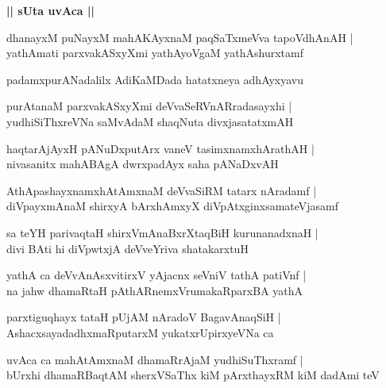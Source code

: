 \documentclass[twoside,12pt,openright]{book}
\newcounter{shloka}[chapter]
\def\uvaca#1{\centerline{{\large\textbf{#1}}}}
\begin{document}
\uvaca{|| sUta uvAca ||}

\begin{shloka}
dhanayxM puNayxM mahAKAyxnaM paqSaTxmeVva tapoVdhAnAH |\\
yathAmati parxvakASxyXmi yathAyoVgaM yathAshurxtamf
\end{shloka}

\begin{center}
padamxpurANadalilx AdiKaMDada hatatxneya adhAyxyavu
\end{center}

\begin{shloka}
purAtanaM parxvakASxyXmi deVvaSeRVnARradasayxhi |\\
yudhiSiThxreVNa saMvAdaM shaqNuta divxjasatatxmAH
\end{shloka}

\begin{shloka}
haqtarAjAyxH pANuDxputArx vaneV tasimxnamxhArathAH |\\
nivasanitx mahABAgA dwrxpadAyx saha pANaDxvAH
\end{shloka}

\begin{shloka}
AthApashayxnamxhAtAmxnaM deVvaSiRM tatarx nAradamf |\\
diVpayxmAnaM shirxyA bArxhAmxyX diVpAtxginxsamateVjasamf
\end{shloka}

\begin{shloka}
sa teYH parivaqtaH shirxVmAnaBxrXtaqBiH kurunanadxnaH |\\
divi BAti hi diVpwtxjA deVveYriva shatakarxtuH
\end{shloka}

\begin{shloka}
yathA ca deVvAnAsxvitirxV yAjacnx seVniV tathA patiVnf |\\
na ja{}hw dhamaRtaH pAthARnemxVrumakaRparxBA yathA
\end{shloka}


\begin{shloka}
parxtiguqhayx tataH pUjAM nAradoV BagavAnaqSiH |\\
AshacxsayadadhxmaRputarxM yukatxrUpirxyeVNa ca
\end{shloka}

\begin{shloka}
uvAca ca mahAtAmxnaM dhamaRrAjaM yudhiSuThxramf |\\
bUrxhi dhamaRBaqtAM sherxVSaThx kiM pArxthayxRM kiM dadAmi teV 
\end{shloka}
\end{document}
